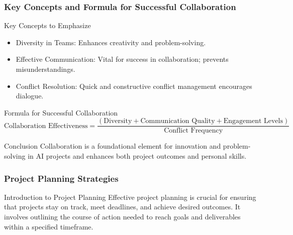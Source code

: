 \documentclass[aspectratio=169]{beamer}
\begin{document}
\begin{frame}[fragile]
    \frametitle{Key Concepts and Formula for Successful Collaboration}
    \begin{block}{Key Concepts to Emphasize}
        \begin{itemize}
            \item Diversity in Teams: Enhances creativity and problem-solving.
            \item Effective Communication: Vital for success in collaboration; prevents misunderstandings.
            \item Conflict Resolution: Quick and constructive conflict management encourages dialogue.
        \end{itemize}
    \end{block}
    
    \begin{block}{Formula for Successful Collaboration}
        \begin{equation}
            \text{Collaboration Effectiveness} = \frac{(\text{Diversity} + \text{Communication Quality} + \text{Engagement Levels})}{\text{Conflict Frequency}}
        \end{equation}
    \end{block}
    
    \begin{block}{Conclusion}
        Collaboration is a foundational element for innovation and problem-solving in AI projects and enhances both project outcomes and personal skills.
    \end{block}
\end{frame}

\begin{frame}[fragile]
    \frametitle{Project Planning Strategies}
    \begin{block}{Introduction to Project Planning}
        Effective project planning is crucial for ensuring that projects stay on track, meet deadlines, and achieve desired outcomes. It involves outlining the course of action needed to reach goals and deliverables within a specified timeframe.
    \end{block}
\end{frame}
\end{document}
